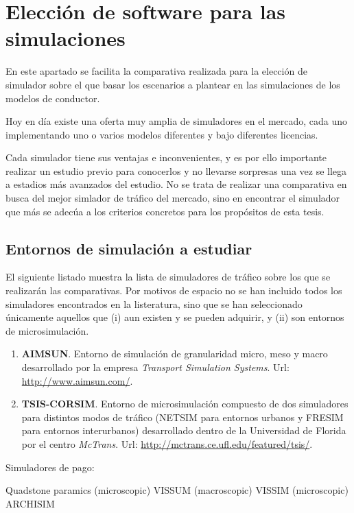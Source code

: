\section{Elección de software para las simulaciones}

En este apartado se facilita la comparativa realizada para la elección de simulador sobre el que basar los escenarios a plantear en las simulaciones de los modelos de conductor.

Hoy en día existe una oferta muy amplia de simuladores en el mercado, cada uno implementando uno o varios modelos diferentes y bajo diferentes licencias.

Cada simulador tiene sus ventajas e inconvenientes, y es por ello importante realizar un estudio previo para conocerlos y no llevarse sorpresas una vez se llega a estadios más avanzados del estudio. No se trata de realizar una comparativa en busca del mejor simlador de tráfico del mercado, sino en encontrar el simulador que más se adecúa a los criterios concretos para los propósitos de esta tesis.

\subsection{Entornos de simulación a estudiar}

El siguiente listado muestra la lista de simuladores de tráfico sobre los que se realizarán las comparativas. Por motivos de espacio no se han incluido todos los simuladores encontrados en la listeratura, sino que se han seleccionado únicamente aquellos que (i) aun existen y se pueden adquirir, y (ii) son entornos de microsimulación.

\begin{enumerate}
	\item \textbf{AIMSUN}. Entorno de simulación de granularidad micro, meso y macro desarrollado por la empresa \textit{Transport Simulation Systems}. Url: \url{http://www.aimsun.com/}.
	\item \textbf{TSIS-CORSIM}. Entorno de microsimulación compuesto de dos simuladores para distintos modos de tráfico (NETSIM para entornos urbanos y FRESIM para entornos interurbanos) desarrollado dentro de la Universidad de Florida por el centro \textit{McTrans}. Url: \url{http://mctrans.ce.ufl.edu/featured/tsis/}.
\end{enumerate}

Simuladores de pago:

Quadstone paramics (microscopic)
VISSUM (macroscopic)
VISSIM (microscopic)
ARCHISIM

